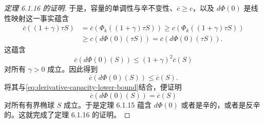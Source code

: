 \begin{proof}[定理 6.1.16 的证明]
于是，容量的单调性与辛不变性、$\overline c\geq c$，以及
$d\Phi(0)$ 是线性映射这一事实蕴含
\[
\begin{aligned}
 \overline c((1+\gamma)\tau S)
 &=\overline c(\Phi_k((1+\gamma)\tau S))
 \geq c(\Phi_k((1+\gamma)\tau S))\\
 &\geq c(d\Phi(0)(\tau S))
 =\overline c(d\Phi(0)(\tau S)).
\end{aligned}
\]
这蕴含
\[
 \overline c(d\Phi(0)(S))
 \leq(1+\gamma)^2\overline c(S)
\]
对所有 $\gamma>0$ 成立。因此得到
\[
 \overline c(d\Phi(0)(S))\leq\overline c(S).
\]
将其与\eqref{eq:derivative-capacity-lower-bound}结合，便证明
\[
 \overline c(d\Phi(0)(S))=\overline c(S)
\]
对所有有界椭球 $S$ 成立。于是定理 6.1.15 蕴含 $d\Phi(0)$ 或者是辛的，或者是反辛的。这就完成了定理 6.1.16 的证明。
\end{proof}
